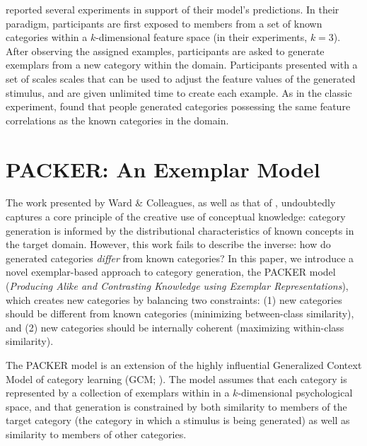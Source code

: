 \documentclass[10pt,letterpaper]{article}
\begin{document}
\citet{jern2013probabilistic} reported several experiments in support of their model's predictions. In their paradigm, participants are first exposed to members from a set of known categories within a $k$-dimensional feature space (in their experiments, $k=3$). After observing the assigned examples, participants are asked to generate exemplars from a new category within the domain. Participants presented with a set of scales scales that can be used to adjust the feature values of the generated stimulus, and are given unlimited time to create each example. As in the classic \cite{ward1994structured} experiment, \citet{jern2013probabilistic} found that people generated categories possessing the same feature correlations as the known categories in the domain.


\section{PACKER: An Exemplar Model}

The work presented by Ward \& Colleagues, as well as that of \citet{jern2013probabilistic}, undoubtedly captures a core principle of the creative use of conceptual knowledge: category generation is informed by the distributional characteristics of known concepts in the target domain. However, this work fails to describe the inverse: how do generated categories \textit{differ} from known categories? In this paper, we introduce a novel exemplar-based approach to category generation, the PACKER model (\textit{Producing Alike and Contrasting Knowledge using Exemplar Representations}), which creates new categories by balancing two constraints: (1) new categories should be different from known categories (minimizing between-class similarity), and (2) new categories should be internally coherent (maximizing within-class similarity). 


The PACKER model is an extension of the highly influential Generalized Context Model of category learning (GCM; \citealp{nosofsky1984choice}). The model assumes that each category is represented by a collection of exemplars within in a $k$-dimensional psychological space, and that generation is constrained by both similarity to members of the target category (the category in which a stimulus is being generated) as well as similarity to members of other categories. 
\end{document}
